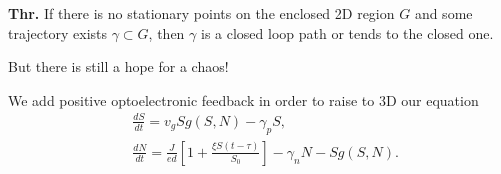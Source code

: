 \textbf{Thr.} If there is no stationary points on the enclosed 2D region $G$ and some trajectory exists $\gamma \subset G$, then $\gamma$ is a closed loop path or tends to the closed one.

\phantom{239}

But there is still a hope for a chaos!

\phantom{239}

We add positive optoelectronic feedback in order to raise to 3D our equation
\begin{align}
	&\frac{d S}{d t} = v_g S g(S,N) - \gamma_p S,\\
	&\frac{d N}{d t} = \frac{J}{e d}[1 + \frac{\xi S(t-\tau)}{S_0}] - \gamma_n N - S g(S,N).
\end{align}